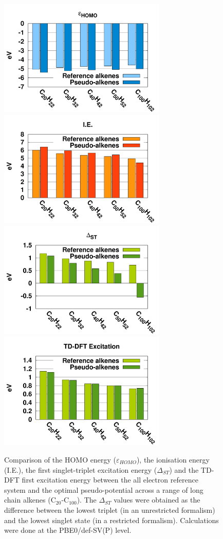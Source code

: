 \documentclass[aip]{revtex4-1}
\begin{document}
\begin{figure}
\begin{center}
\includegraphics[width=8cm]{long_pbe0_homo}
\includegraphics[width=8cm]{long_pbe0_ie}
\includegraphics[width=8cm]{long_pbe0_st}
\includegraphics[width=8cm]{long_pbe0_tddft}
\end{center}

\caption{Comparison of the HOMO energy ($\varepsilon_{HOMO}$),
the ionisation energy (I.E.),
the first singlet-triplet excitation energy ($\Delta_{ST}$) and
the TD-DFT first excitation energy
between the
all electron reference system and the optimal pseudo-potential across a range of long chain alkenes (C\(_{20}\)-C\(_{100}\)).
The $\Delta_{ST}$ values were obtained as the difference
between the lowest triplet (in an unrestricted formalism) and the lowest singlet state
(in a restricted formalism).
Calculations were done at the PBE0/def-SV(P) level.}
\label{fig:long_chain_graphs}
\end{figure}
\end{document}
